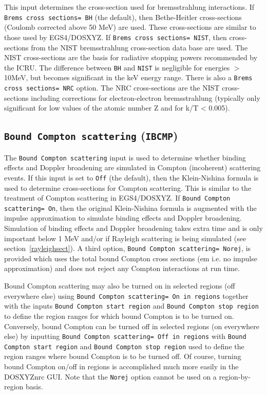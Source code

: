 \documentclass[12pt,twoside]{article}      %
\begin{document}
This input determines the cross-section used for bremsstrahlung interactions.
If {\tt Brems cross sections= BH} (the default), then Bethe-Heitler cross-sections
(Coulomb corrected above 50 MeV)\cite{KM59} are used.  These cross-sections
are similar to those used by EGS4/DOSXYZ.  If {\tt Brems cross sections= NIST}, then
cross-sections from the NIST bremsstrahlung cross-section data base\cite{SB85,SB86a}
are used.  The NIST cross-sections are the basis for radiative stopping powers
recommended by the ICRU\cite{ICRU37}.  The difference between {\tt BH} and
{\tt NIST} is negligible for energies $>$ 10MeV, but becomes significant in
the keV energy range. There is also
a {\tt Brems cross sections= NRC} option.  The NRC cross-sections
are the NIST cross-sections including corrections for electron-electron
bremsstrahlung (typically only
significant for low values of the atomic number Z and for k/T < 0.005).

\subsection{{\tt Bound Compton scattering} ({\tt IBCMP})}
\label{bcsect}

The {\tt Bound Compton scattering} input is used to determine whether binding effects
and Doppler broadening are simulated in Compton (incoherent) scattering
events.  If this input is set to {\tt Off} (the default), then the Klein-Nishina
formula\cite{KN29} is used to determine cross-sections for
Compton scattering.  This is similar to the treatment of Compton scattering
in EGS4/DOSXYZ.  If {\tt Bound Compton scattering= On}, then
the original Klein-Nishina formula is augmented with the
impulse approximation\cite{Ri75} to simulate binding effects and
Doppler broadening.  Simulation of binding effects and Doppler broadening takes
extra time and is only important below 1 MeV and/or if Rayleigh
scattering is being simulated (see section~\ref{rayleighsect}).
A third option, {\tt Bound Compton scattering= Norej}, is provided which
uses the total bound Compton cross sections ({em i.e.} no impulse
approximation) and does not reject any Compton interactions at run
time.

Bound Compton scattering may also be turned on in selected regions
(off everywhere else) using
{\tt  Bound Compton scattering= On in regions} together with
the inputs {\tt Bound Compton start region} and {\tt Bound Compton stop region}
to define the region ranges for which bound Compton is to be turned on.
Conversely, bound Compton can be turned off in selected regions
(on everywhere else) by inputting
{\tt  Bound Compton scattering= Off in regions} with
{\tt Bound Compton start region} and {\tt Bound Compton stop region} used
to define the region ranges where bound Compton is to be turned off.  Of
course, turning bound Compton on/off in regions is accomplished much more
easily in the DOSXYZnrc GUI.  Note that the {\tt Norej} option cannot be
used on a region-by-region basis.
\end{document}
